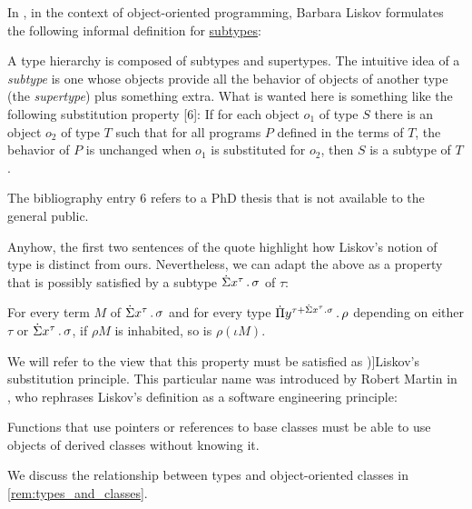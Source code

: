 \begin{concept}\label{con:liskov_substitution_principle}
  In \cite[25]{Liskov1987DataAbstractionAndHierarchy}, in the context of object-oriented programming, Barbara Liskov formulates the following informal definition for \hyperref[def:subtype]{subtypes}:
  \begin{displayquote}
    A type hierarchy is composed of subtypes and supertypes. The intuitive idea of a \textit{subtype} is one whose objects provide all the behavior of objects of another type (the \textit{supertype}) plus something extra. What is wanted here is something like the following substitution property [6]: If for each object \( o_1 \) of type \( S \) there is an object \( o_2 \) of type \( T \) such that for all programs \( P \) defined in the terms of \( T \), the behavior of \( P \) is unchanged when \( o_1 \) is substituted for \( o_2 \), then \( S \) is a subtype of \( T \).
  \end{displayquote}

  The bibliography entry \( 6 \) refers to a PhD thesis that is not available to the general public.

  Anyhow, the first two sentences of the quote highlight how Liskov's notion of type is distinct from ours. Nevertheless, we can adapt the above as a property that is possibly satisfied by a subtype \( \qsum {x^\tau} \sigma \) of \( \tau \):
  \begin{displayquote}
    For every term \( M \) of \( \qsum {x^\tau} \sigma \) and for every type \( \qprod {y^{\tau + \qsum {x^\tau} \sigma}} \rho \) depending on either \( \tau \) or \( \qsum {x^\tau} \sigma \), if \( \rho M \) is inhabited, so is \( \rho (\iota M) \).
  \end{displayquote}

  We will refer to the view that this property must be satisfied as \term[en=(the) Liskov substitution principle (\cite*[1]{Martin1996LiskovSubstitutionPrinciple})]{Liskov's substitution principle}. This particular name was introduced by Robert Martin in \cite[1]{Martin1996LiskovSubstitutionPrinciple}, who rephrases Liskov's definition as a software engineering principle:
  \begin{displayquote}
    Functions that use pointers or references to base classes must be able to use objects of derived classes without knowing it.
  \end{displayquote}

  We discuss the relationship between types and object-oriented classes in \cref{rem:types_and_classes}.
\end{concept}

